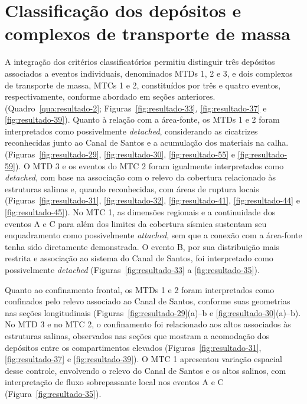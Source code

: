 \section{Classificação dos depósitos e complexos de transporte de massa}\label{sec:5-9}

A integração dos critérios classificatórios permitiu distinguir três depósitos associados a eventos individuais, denominados MTDs 1, 2 e 3, e dois complexos de transporte de massa, MTCs 1 e 2, constituídos por três e quatro eventos, respectivamente, conforme abordado em seções anteriores. (Quadro~\ref{qua:resultado-2}; Figuras~\ref{fig:resultado-33}, \ref{fig:resultado-37} e \ref{fig:resultado-39}). Quanto à relação com a área-fonte, os MTDs 1 e 2 foram interpretados como possivelmente \textit{detached}, considerando as cicatrizes reconhecidas junto ao Canal de Santos e a acumulação dos materiais na calha. (Figuras~\ref{fig:resultado-29}, \ref{fig:resultado-30}, \ref{fig:resultado-55} e \ref{fig:resultado-59}). O MTD 3 e os eventos do MTC 2 foram igualmente interpretados como \textit{detached}, com base na associação com o relevo da cobertura relacionado às estruturas salinas e, quando reconhecidas, com áreas de ruptura locais (Figuras~\ref{fig:resultado-31}, \ref{fig:resultado-32}, \ref{fig:resultado-41}, \ref{fig:resultado-44} e \ref{fig:resultado-45}). No MTC 1, as dimensões regionais e a continuidade dos eventos A e C para além dos limites da cobertura sísmica sustentam seu enquadramento como possivelmente \textit{attached}, sem que a conexão com a área-fonte tenha sido diretamente demonstrada. O evento B, por sua distribuição mais restrita e associação ao sistema do Canal de Santos, foi interpretado como possivelmente \textit{detached} (Figuras~\ref{fig:resultado-33} a \ref{fig:resultado-35}).

Quanto ao confinamento frontal, os MTDs 1 e 2 foram interpretados como confinados pelo relevo associado ao Canal de Santos, conforme suas geometrias nas seções longitudinais (Figuras~\ref{fig:resultado-29}(a)--b e \ref{fig:resultado-30}(a)--b). No MTD 3 e no MTC 2, o confinamento foi relacionado aos altos associados às estruturas salinas, observados nas seções que mostram a acomodação dos depósitos entre os compartimentos elevados (Figuras~\ref{fig:resultado-31}, \ref{fig:resultado-37} e \ref{fig:resultado-39}). O MTC 1 apresentou variação espacial desse controle, envolvendo o relevo do Canal de Santos e os altos salinos, com interpretação de fluxo sobrepassante local nos eventos A e C (Figura~\ref{fig:resultado-35}).

